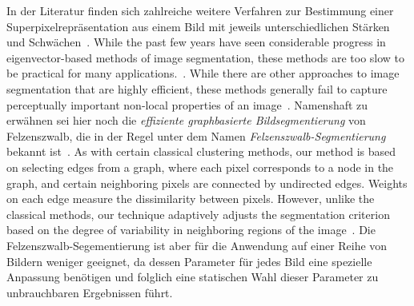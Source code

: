 In der Literatur finden sich zahlreiche weitere Verfahren zur Bestimmung einer Superpixelrepräsentation aus einem Bild mit jeweils unterschiedlichen Stärken und Schwächen~\cite{super, slic}.
While the past few years have seen considerable progress in eigenvector-based
methods of image segmentation, these methods are too slow to be
practical for many applications.~\cite{felzenszwalb}.
While there are other approaches to image segmentation that are highly efficient, these
methods generally fail to capture perceptually important non-local properties of an
image~\cite{felzenszwalb}.
Namenshaft zu erwähnen sei hier noch die \emph{effiziente graphbasierte Bildsegmentierung} von Felzenszwalb, die in der Regel unter dem Namen \emph{Felzenszwalb-Segmentierung} bekannt ist~\cite{felzenszwalb}.
As with certain classical clustering methods, our method is based on
selecting edges from a graph, where each pixel corresponds to a node in the graph,
and certain neighboring pixels are connected by undirected edges. Weights on each
edge measure the dissimilarity between pixels. However, unlike the classical methods,
our technique adaptively adjusts the segmentation criterion based on the degree of
variability in neighboring regions of the image~\cite{felzenszwalb}.
Die Felzenszwalb-Segementierung ist aber für die Anwendung auf einer Reihe von Bildern weniger geeignet, da dessen Parameter für jedes Bild eine spezielle Anpassung benötigen und folglich eine statischen Wahl dieser Parameter zu unbrauchbaren Ergebnissen führt.
